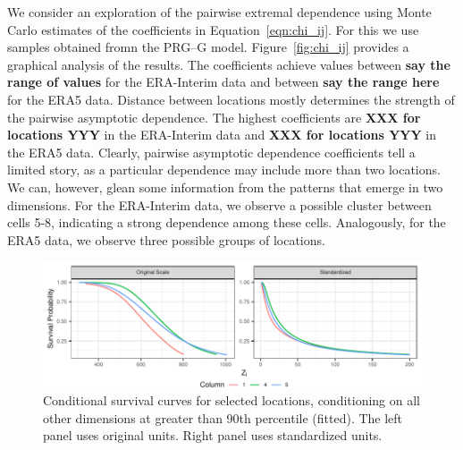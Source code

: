 We consider an exploration of the pairwise extremal dependence using Monte Carlo estimates of the 
coefficients in  Equation~\ref{eqn:chi_ij}. For this we use samples obtained fromn the PRG--G model.
Figure~\ref{fig:chi_ij} provides a graphical analysis of the results. 
The coefficients achieve values between {\bf say the range of values} for the ERA-Interim data and between {\bf say the range here} for the ERA5 data. Distance between locations mostly determines the strength of the pairwise asymptotic dependence. The highest coefficients are {\bf XXX for locations YYY} in the ERA-Interim data and {\bf XXX for locations YYY} in the ERA5 data.  Clearly, pairwise asymptotic
  dependence coefficients tell a limited story, as a particular dependence may include
  more than two locations.   We can, however, glean some information from the patterns that emerge in
  two dimensions.  For the ERA-Interim data, we observe a possible cluster between cells 5-8, indicating a
  strong dependence among these cells.  Analogously, for the ERA5 data, we observe three possible groups  of locations.

\begin{figure}[ht]
    \centering
    \caption{Conditional survival curves for selected locations, conditioning on all other dimensions at greater than 90th percentile (fitted)\label{fig:condsurv1d}. The left panel uses original units. Right panel uses standardized units.}
    \includegraphics{./images/condsurv_1d}
\end{figure}

